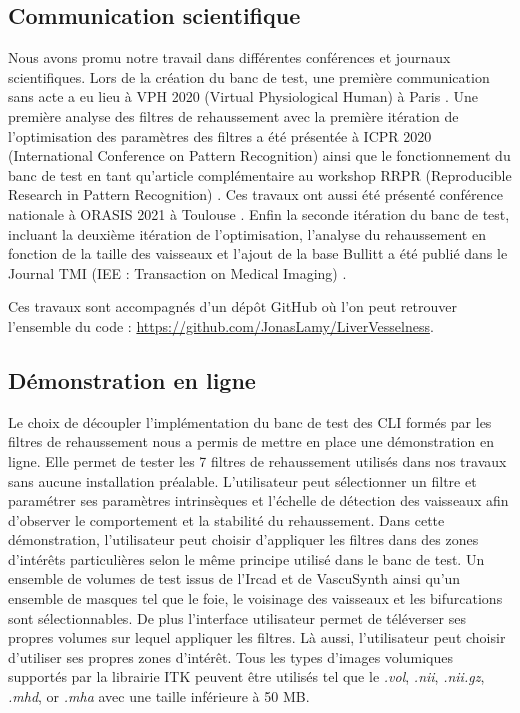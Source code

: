 \subsection{Communication scientifique}
Nous avons promu notre travail dans différentes conférences et journaux scientifiques. Lors de la création du banc de test, une première communication sans acte a eu lieu à VPH 2020 (Virtual Physiological Human) à Paris \cite{Lamy2020_VPH_bench}. Une première analyse des filtres de rehaussement avec la première itération de l'optimisation des paramètres des filtres a été présentée à ICPR 2020 (International Conference on Pattern Recognition) \cite{Lamy2020_ICPR} ainsi que le fonctionnement du banc de test en tant qu'article complémentaire au workshop RRPR (Reproducible Research in Pattern Recognition) \cite{Lamy2021_RRPR}. Ces travaux ont aussi été présenté conférence nationale à ORASIS 2021 à Toulouse \cite{Lamy2021_ORASIS}. Enfin la seconde itération du banc de test, incluant la deuxième itération de l'optimisation, l'analyse du rehaussement en fonction de la taille des vaisseaux et l'ajout de la base Bullitt a été publié dans le Journal TMI (IEE : Transaction on Medical Imaging) \cite{Lamy2022_TMI}.

Ces travaux sont accompagnés d'un dépôt GitHub où l'on peut retrouver l'ensemble du code : \url{https://github.com/JonasLamy/LiverVesselness}. 


\subsection{Démonstration en ligne}

Le choix de découpler l'implémentation du banc de test des CLI formés par les filtres de rehaussement nous a permis de mettre en place une démonstration en ligne. Elle permet de tester les 7 filtres de rehaussement utilisés dans nos travaux sans aucune installation préalable. L'utilisateur peut sélectionner un filtre et paramétrer ses paramètres intrinsèques et l'échelle de détection des vaisseaux afin d'observer le comportement et la stabilité du rehaussement. Dans cette démonstration, l'utilisateur peut choisir d'appliquer les filtres dans des zones d'intérêts particulières selon le même principe utilisé dans le banc de test. Un ensemble de volumes de test issus de l'Ircad et de VascuSynth ainsi qu'un ensemble de masques tel que le foie, le voisinage des vaisseaux et les bifurcations sont sélectionnables. De plus l'interface utilisateur permet de téléverser ses propres volumes sur lequel appliquer les filtres. Là aussi, l'utilisateur peut choisir d'utiliser ses propres zones d'intérêt. Tous les types d'images volumiques supportés par la librairie ITK peuvent être utilisés tel que le \textit{.vol}, \textit{.nii}, \textit{.nii.gz}, \textit{.mhd}, or \textit{.mha} avec une taille inférieure à 50 MB.


